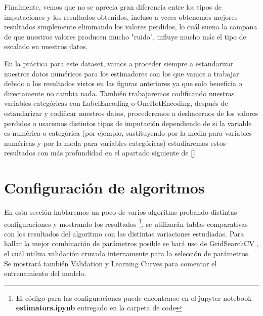 \documentclass[12pt,twoside]{report}
\begin{document}
Finalmente, vemos que no se aprecia gran diferencia entre los tipos de imputaciones y los resultados obtenidos, incluso a veces obtenemos mejores resultados simplemente eliminando los valores perdidos, lo cuál suena la campana de que nuestros valores producen mucho "ruido", influye mucho más el tipo de escalado en nuestros datos.

En la práctica para este dataset, vamos a proceder siempre a estandarizar nuestros datos numéricos para los estimadores con los que vamos a trabajar debido a los resultados vistos en las figuras anteriores ya que solo beneficia o directamente no cambia nada. También trabajaremos  codificando nuestras variables categóricas con LabelEncoding o OneHotEncoding, después de estandarizar y codificar nuestros datos, procederemos a deshacernos de los valores perdidos o usaremos distintos tipos de imputación dependiendo de si la variable es numérica o categórica (por ejemplo, sustituyendo por la media para variables numéricas y por la moda para variables categóricas) estudiaremos estos resultados con más profundidad en el apartado siguiente de \textbf{[]}

\chapter*{Configuración de algoritmos}
\label{chapter:cfg}

En esta sección hablaremos un poco de varios algoritms probando distintas configuraciones y mostrando los resultados \footnote{El código para las configuraciones puede encontrarse en el jupyter notebook \textbf{estimators.ipynb} entregado en la carpeta de code}, se utilizarán tablas comparativas con los resultados del algoritmo con las distintas variaciones estudiadas. Para hallar la mejor combinación de parámetros posible se hará uso de GridSearchCV \cite{grid-search-cv}, el cuál utiliza validación cruzada internamente para la selección de parámetros. Se mostrará también Validation y Learning Curves para comentar el entrenamiento del modelo.
\end{document}
